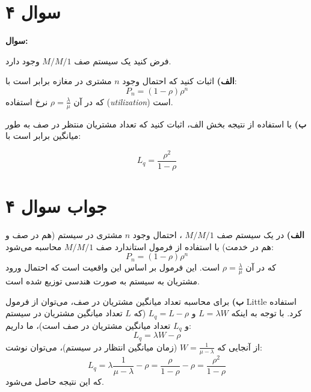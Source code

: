 \section*{سوال ۴}
	
\textbf{سوال:}
	
فرض کنید یک سیستم صف
$M/M/1$
وجود دارد. 
	
\textbf{الف)} اثبات کنید که احتمال وجود \(n\) مشتری در مغازه برابر است با:
\[
P_n = (1 - \rho)\rho^n
\]
که در آن \(\rho = \frac{\lambda}{\mu}\) نرخ استفاده (\textit{utilization}) است.
	
\textbf{ب)} با استفاده از نتیجه بخش الف، اثبات کنید که تعداد مشتریان منتظر در صف به طور میانگین برابر است با:

\[
L_q = \frac{\rho^2}{1 - \rho}
\]

\section*{جواب سوال ۴}

\textbf{الف)} در یک سیستم صف 
$M/M/1$
، احتمال وجود \(n\) مشتری در سیستم (هم در صف و هم در خدمت) با استفاده از فرمول استاندارد صف
$M/M/1$
محاسبه می‌شود:
\[
P_n = (1 - \rho)\rho^n
\]
که در آن \(\rho = \frac{\lambda}{\mu}\) است. این فرمول بر اساس این واقعیت است که احتمال ورود مشتریان به سیستم به صورت هندسی توزیع شده است.

\textbf{ب)} برای محاسبه تعداد میانگین مشتریان در صف، می‌توان از فرمول Little استفاده کرد. با توجه به اینکه \(L = \lambda W\) و \(L_q = L - \rho\) (که \(L\) تعداد میانگین مشتریان در سیستم و \(L_q\) تعداد میانگین مشتریان در صف است)، ما داریم:
\[
L_q = \lambda W - \rho
\]
از آنجایی که \(W = \frac{1}{\mu - \lambda}\) (زمان میانگین انتظار در سیستم)، می‌توان نوشت:
\[
L_q = \lambda \frac{1}{\mu - \lambda} - \rho = \frac{\rho}{1 - \rho} - \rho = \frac{\rho^2}{1 - \rho}
\]
که این نتیجه حاصل می‌شود.